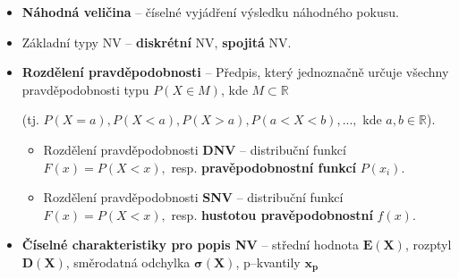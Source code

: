 \newcommand{\pointing}{\texttt{[image: assets/point.png]}}
\begin{itemize}
    \item \textbf{Náhodná veličina} -- číselné vyjádření výsledku náhodného pokusu.
    \item Základní typy NV -- \textbf{diskrétní} NV, \textbf{spojitá} NV.
    \item \textbf{Rozdělení pravděpodobnosti} -- Předpis, který jednoznačně určuje všechny pravděpodobnosti typu $P(X \in M)$, kde $M \subset \mathbb{R}$

          (tj. $P (X = a), P (X < a), P(X > a), P(a < X < b), ...,$ kde $a, b \in \mathbb{R}$).
          \begin{itemize}
              \item Rozdělení pravděpodobnosti \textbf{DNV} -- distribuční funkcí $F(x) = P(X < x),$ resp. \textbf{pravěpodobnostní funkcí} $P(x_i)$.
              \item Rozdělení pravděpodobnosti \textbf{SNV} -- distribuční funkcí $F(x) = P(X < x),$ resp. \textbf{hustotou pravěpodobnostní} $f(x)$.
          \end{itemize}
    \item \textbf{Číselné charakteristiky pro popis NV} -- střední hodnota $\mathbf{E(X)}$, rozptyl $\mathbf{D(X)}$, směrodatná odchylka $\mathbf{\sigma(X)}$, p--kvantily $\mathbf{x_p}$
\end{itemize}

